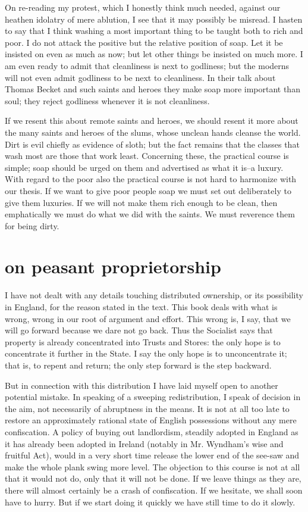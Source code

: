 \documentclass[final,10pt,letterpaper,twocolumn,openany]{book}
\begin{document}
     On re-reading my protest, which I honestly think much needed, against
our heathen idolatry of mere ablution, I see that it may possibly be misread.
I hasten to say that I think washing a most important thing to be taught
both to rich and poor. I do not attack the positive but the relative position
of soap. Let it be insisted on even as much as now; but let other things be
insisted on much more. I am even ready to admit that cleanliness is next to
godliness; but the moderns will not even admit godliness to be next to
cleanliness. In their talk about Thomas Becket and such saints and heroes
they make soap more important than soul; they reject godliness whenever
it is not cleanliness. 

If we resent this about remote saints and heroes, we
should resent it more about the many saints and heroes of the slums,
whose unclean hands cleanse the world. Dirt is evil chiefly as evidence of
sloth; but the fact remains that the classes that wash most are those that
work least. Concerning these, the practical course is simple; soap should
be urged on them and advertised as what it is--a luxury. With regard to the
poor also the practical course is not hard to harmonize with our thesis. If
we want to give poor people soap we must set out deliberately to give
them luxuries. If we will not make them rich enough to be clean, then
emphatically we must do what we did with the saints. We must reverence
them for being dirty.

\section{on peasant proprietorship}

     I have not dealt with any details touching distributed ownership, or its
possibility in England, for the reason stated in the text. This book deals
with what is wrong, wrong in our root of argument and effort. This wrong
is, I say, that we will go forward because we dare not go back. Thus the
Socialist says that property is already concentrated into Trusts and Stores:
the only hope is to concentrate it further in the State. I say the only hope is
to unconcentrate it; that is, to repent and return; the only step forward is
the step backward.

But in connection with this distribution I have laid myself open to
another potential mistake. In speaking of a sweeping redistribution, I
speak of decision in the aim, not necessarily of abruptness in the means. It
is not at all too late to restore an approximately rational state of English
possessions without any mere confiscation. A policy of buying out
landlordism, steadily adopted in England as it has already been adopted in
Ireland (notably in Mr. Wyndham's wise and fruitful Act), would in a very
short time release the lower end of the see-saw and make the whole plank
swing more level. The objection to this course is not at all that it would not
do, only that it will not be done. If we leave things as they are, there will
almost certainly be a crash of confiscation. If we hesitate, we shall soon
have to hurry. But if we start doing it quickly we have still time to do it
slowly.
\end{document}
